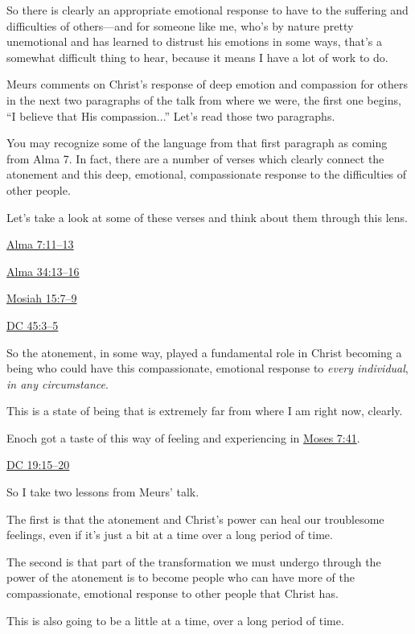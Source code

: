 \begin{compactitem}
\begin{compactitem}
\begin{compactitem}
						\end{compactitem}
					\item So there is clearly an appropriate emotional response to have to the suffering and difficulties of others---and for someone like me, who's by nature pretty unemotional and has learned to distrust his emotions in some ways, that's a somewhat difficult thing to hear, because it means I have a lot of work to do.
					\item Meurs comments on Christ's response of deep emotion and compassion for others in the next two paragraphs of the talk from where we were, the first one begins, ``I believe that His compassion...'' Let's read those two paragraphs.
					\item You may recognize some of the language from that first paragraph as coming from Alma 7. In fact, there are a number of verses which clearly connect the atonement and this deep, emotional, compassionate response to the difficulties of other people.
					\item Let's take a look at some of these verses and think about them through this lens.
						\begin{compactitem}
							\item \hyperref[ALMA-7-11]{Alma 7:11--13}
							\item \hyperref[ALMA-34-13]{Alma 34:13--16}
							\item \hyperref[MOSIAH-15-7]{Mosiah 15:7--9}
							\item \hyperref[DC45-3]{DC 45:3--5}
						\end{compactitem}
					\item So the atonement, in some way, played a fundamental role in Christ becoming a being who could have this compassionate, emotional response to \textit{every individual}, \textit{in any circumstance}.
					\item This is a state of being that is extremely far from where I am right now, clearly.
					\item Enoch got a taste of this way of feeling and experiencing in \hyperref[MOSES-7-41]{Moses 7:41}.
					\item \hyperref[DC19-15]{DC 19:15--20}
				\end{compactitem}
			
			\item So I take two lessons from Meurs' talk.
				\begin{compactitem}
					\item The first is that the atonement and Christ's power can heal our troublesome feelings, even if it's just a bit at a time over a long period of time.
					\item The second is that part of the transformation we must undergo through the power of the atonement is to become people who can have more of the compassionate, emotional response to other people that Christ has.
						\begin{compactitem}
							\item This is also going to be a little at a time, over a long period of time.
						\end{compactitem}
				\end{compactitem}
			

\end{compactitem}
